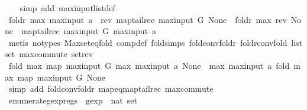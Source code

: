 \begin{isabellebody}
%
\isadelimproof
\ \ %
\endisadelimproof
%
\isatagproof
{}\isamarkupfalse%
\ {\isacharparenleft}simp\ add{\isacharcolon}\ max{\isacharunderscore}input{\isacharunderscore}list{\isacharunderscore}def{\isacharparenright}\isanewline
{}\isamarkupfalse%
\ {\isacharminus}\isanewline
\ \ \isamarkupfalse%
\ {\isachardoublequoteopen}foldr\ max\ {\isacharparenleft}max{\isacharunderscore}input\ a\ {\isacharhash}\ rev\ {\isacharparenleft}map{\isacharunderscore}tailrec\ max{\isacharunderscore}input\ G{\isacharparenright}{\isacharparenright}\ None\ {\isacharequal}\ foldr\ max\ {\isacharparenleft}rev\ {\isacharparenleft}None\ {\isacharhash}\ map{\isacharunderscore}tailrec\ max{\isacharunderscore}input\ G{\isacharparenright}{\isacharparenright}\ {\isacharparenleft}max{\isacharunderscore}input\ a{\isacharparenright}{\isachardoublequoteclose}\isanewline
\ \ \ \ \isamarkupfalse%
\ {\isacharparenleft}metis\ {\isacharparenleft}no{\isacharunderscore}types{\isacharparenright}\ Max{\isachardot}set{\isacharunderscore}eq{\isacharunderscore}fold\ comp{\isacharunderscore}def\ fold{\isachardot}simps{\isacharparenleft}{}{\isacharparenright}\ fold{\isacharunderscore}conv{\isacharunderscore}foldr\ foldr{\isacharunderscore}conv{\isacharunderscore}fold\ list{\isachardot}set{\isacharparenleft}{}{\isacharparenright}\ max{\isachardot}commute\ set{\isacharunderscore}rev{\isacharparenright}\isanewline
\ \ \isamarkupfalse%
\ \isamarkupfalse%
\ {\isachardoublequoteopen}fold\ max\ {\isacharparenleft}map\ max{\isacharunderscore}input\ G{\isacharparenright}\ {\isacharparenleft}max\ {\isacharparenleft}max{\isacharunderscore}input\ a{\isacharparenright}\ None{\isacharparenright}\ {\isacharequal}\ max\ {\isacharparenleft}max{\isacharunderscore}input\ a{\isacharparenright}\ {\isacharparenleft}fold\ max\ {\isacharparenleft}map\ max{\isacharunderscore}input\ G{\isacharparenright}\ None{\isacharparenright}{\isachardoublequoteclose}\isanewline
\ \ \ \ \isamarkupfalse%
\ {\isacharparenleft}simp\ add{\isacharcolon}\ fold{\isacharunderscore}conv{\isacharunderscore}foldr\ map{\isacharunderscore}eq{\isacharunderscore}map{\isacharunderscore}tailrec\ max{\isachardot}commute{\isacharparenright}\isanewline
{}\isamarkupfalse%
%
\endisatagproof
{\isafoldproof}%
%
\isadelimproof
\isanewline
%
\endisadelimproof
\isanewline
{}\isamarkupfalse%
\ enumerate{\isacharunderscore}gexp{\isacharunderscore}regs\ {\isacharcolon}{\isacharcolon}\ {\isachardoublequoteopen}gexp\ {\isasymRightarrow}\ nat\ set{\isachardoublequoteclose}\ \isanewline

\end{isabellebody}
